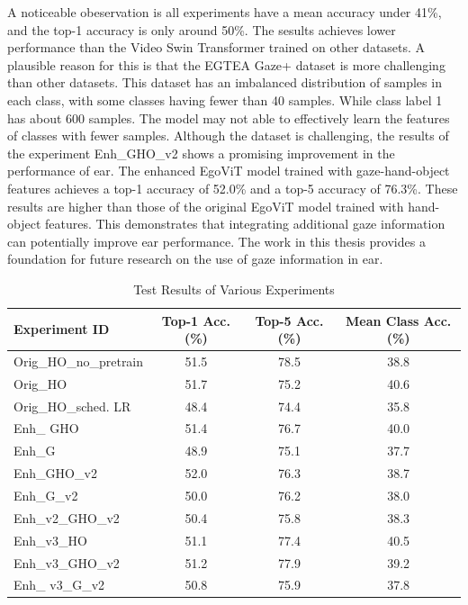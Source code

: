 A noticeable obeservation is all experiments have a mean accuracy under 41\%, and the top-1 accuracy is only around 50\%. The sesults achieves lower performance than the Video Swin Transformer trained on other datasets. A plausible reason for this is that the EGTEA Gaze+ dataset is more challenging than other datasets. This dataset has an imbalanced distribution of samples in each class, with some classes having fewer than 40 samples. While class label 1 has about 600 samples. The model may not able to effectively learn the features of classes with fewer samples. 
\newpage
Although the dataset is challenging, the results of the experiment Enh\_GHO\_v2 shows a promising improvement in the performance of \gls{ear}. The enhanced EgoViT model trained with gaze-hand-object features achieves a top-1 accuracy of 52.0\% and a top-5 accuracy of 76.3\%. These results are higher than those of the original EgoViT model trained with hand-object features. This demonstrates that integrating additional gaze information can potentially improve \gls{ear} performance. The work in this thesis provides a foundation for future research on the use of gaze information in \gls{ear}.


\vspace{5mm}
\begin{table}[htbp]
    \centering
    \caption{Test Results of Various Experiments}
    \begin{tabular}{lccc}
    \hline\hline
    Experiment ID & Top-1 Acc.(\%)& Top-5 Acc.(\%)& Mean Class Acc.(\%) \\
    \hline
    Orig\_HO\_no\_pretrain & 51.5 & 78.5 & 38.8 \\
    Orig\_HO               & 51.7 & 75.2 & 40.6 \\
    Orig\_HO\_sched. LR    & 48.4 & 74.4 & 35.8 \\
    Enh\_ GHO           & 51.4 & 76.7 & 40.0 \\
    Enh\_G              & 48.9 & 75.1 & 37.7 \\
    Enh\_GHO\_v2        & 52.0 & 76.3 & 38.7 \\
    Enh\_G\_v2          & 50.0 & 76.2 & 38.0 \\
    Enh\_v2\_GHO\_v2    & 50.4 & 75.8 & 38.3 \\
    Enh\_v3\_HO         & 51.1 & 77.4 & 40.5 \\
    Enh\_v3\_GHO\_v2    & 51.2 & 77.9 & 39.2 \\
    Enh\_ v3\_G\_v2     & 50.8 & 75.9 & 37.8 \\
    \hline\hline
    \end{tabular}
    \label{tab:Results_all}
\end{table}